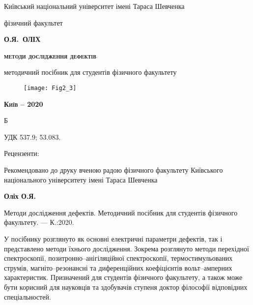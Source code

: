 \begin{titlepage}
\begin{center}

{\small Київський національний університет  імені Тараса Шевченка}

{\small фізичний факультет}


\vspace*{2cm}
{\scshape\bfseries\Large О.Я.~ОЛІХ}

\vspace*{1cm}
{\scshape\bfseries\huge методи дослідження дефектів}

\vspace*{0.5cm}
методичний посібник для студентів фізичного факультету

\end{center}
%
\vspace*{2cm}
\begin{figure}[h]\center
\texttt{[image: Fig2\_3]}
\end{figure}
%
%
\begin{center}

{\scshape\bfseries Київ -- 2020}
\end{center}
\end{titlepage}
Б

УДК 537.9; 53.083.

\begin{center}

 \vspace{0.04\textheight}
 Рецензенти:
\end{center}

%

\vspace{1cm}
Рекомендовано до друку вченою радою фізичного факультету
Київського національного університету імені Тараса Шевченка



\vspace{1cm}
\textbf{Оліх О.Я.}

Методи дослідження дефектів. Методичний посібник для студентів фізичного факультету. --- К.:2020.

\vspace{1cm}
У посібнику розглянуто як основні електричні параметри дефектів,
так і представлено методи їхнього дослідження.
Зокрема розглянуто методи перехідної спектроскопії,
позитронно--анігіляційної спектроскопії,
термостимульованих струмів,
магніто--резонансні
та диференційних коефіцієнтів вольт--амперних характеристик.
Призначений для студентів фізичного факультету, а також
може бути корисний для науковців  та  здобувачів  ступеня  доктор  філософії
відповідних спеціальностей.
